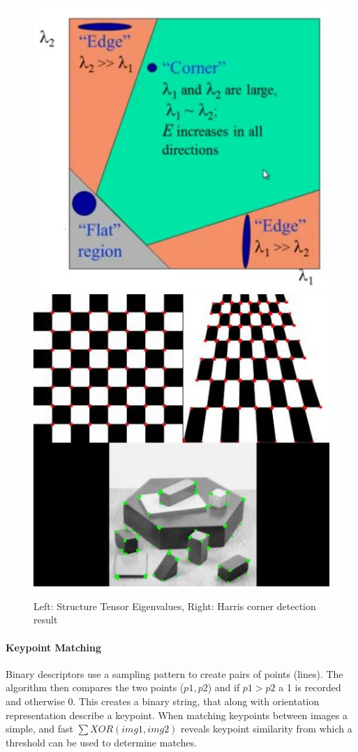 \documentclass[a4paper,11pt,notitlepage]{article}
\begin{document}
\noindent \begin{figure}[h!] 
	\includegraphics[width = 0.5\hsize]{figures/harris_region.jpg}
	\includegraphics[width = 0.45\hsize]{figures/harris_result.jpg}
	\caption{Left: Structure Tensor Eigenvalues, Right: Harris corner detection result \cite{opencv_harris_article} }
	\label{Harris}
\end{figure}

\paragraph{Keypoint Matching}
Binary descriptors use a sampling pattern to create pairs of points (lines). The algorithm then compares the two points ($p1,p2$) and if $p1 > p2$ a 1 is recorded and otherwise 0. This creates a binary string, that along with orientation representation describe a keypoint. When matching keypoints between images a simple, and fast $\sum XOR(img1,img2)$ reveals keypoint similarity from which a threshold can be used to determine matches.
\end{document}
